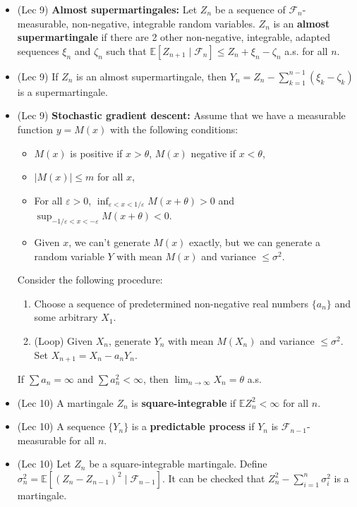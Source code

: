 \documentclass[twoside]{article}
\newcommand{\dis}{\displaystyle}
\newcommand\bbE{\mathbb{E}}
\newcommand\calF{\mathcal{F}}
\def\eps{\varepsilon}
\newcommand\sg{\sigma}
\def\t{\theta}
\begin{document}
\begin{itemize}
\item (Lec 9) \textbf{Almost supermartingales:} Let $Z_n$ be a sequence of $\calF_n$-measurable, non-negative, integrable random variables. $Z_n$ is an \textbf{almost supermartingale} if there are 2 other non-negative, integrable, adapted sequences $\xi_n$ and $\zeta_n$ such that $\bbE [Z_{n+1} \mid \calF_n] \leq Z_n + \xi_n - \zeta_n$ a.s. for all $n$.

\item (Lec 9) If $Z_n$ is an almost supermartingale, then $Y_n = Z_n - \dis\sum_{k=1}^{n-1} (\xi_k - \zeta_k)$ is a supermartingale.

\item (Lec 9) \textbf{Stochastic gradient descent:} Assume that we have a measurable function $y = M(x)$ with the following conditions: 
\begin{itemize}
\item $M(x)$ is positive if $x > \t$,  $M(x)$ negative if $x < \t$, 
\item $|M(x)| \leq m$ for all $x$,
\item For all $\eps > 0$, $\inf_{\eps < x < 1/\eps} M(x + \t) > 0$ and $\sup_{-1/\eps < x < -\eps} M(x + \t) < 0$.
\item Given $x$, we can't generate $M(x)$ exactly, but we can generate a random variable $Y$ with mean $M(x)$ and variance $\leq \sg^2$.
\end{itemize}

Consider the following procedure:
\begin{enumerate}
\item Choose a sequence of predetermined non-negative real numbers $\{ a_n \}$ and some arbitrary $X_1$.
\item (Loop) Given $X_n$, generate $Y_n$ with mean $M(X_n)$ and variance $\leq \sg^2$. Set $X_{n+1} = X_n - a_n Y_n$.
\end{enumerate}

If $\sum a_n = \infty$ and $\sum a_n^2 < \infty$, then $\dis\lim_{n \rightarrow \infty} X_n = \t$ a.s. 

\item (Lec 10) A martingale $Z_n$ is \textbf{square-integrable} if $\bbE Z_n^2 < \infty$ for all $n$.

\item (Lec 10) A sequence $\{ Y_n \}$ is a \textbf{predictable process} if $Y_n$ is $\calF_{n-1}$-measurable for all $n$.

\item (Lec 10) Let $Z_n$ be a square-integrable martingale. Define $\sg_n^2 = \bbE [(Z_n - Z_{n-1})^2 \mid \calF_{n-1}]$. It can be checked that $Z_n^2 - \displaystyle\sum_{i=1}^n \sg_i^2$ is a martingale.


\end{itemize}
\end{document}

